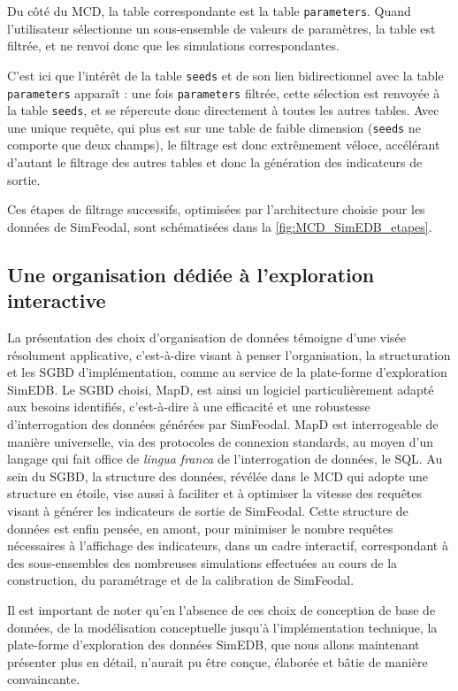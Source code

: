 		Du côté du MCD, la table correspondante est la table \texttt{parameters}. Quand l'utilisateur sélectionne un sous-ensemble de valeurs de paramètres, la table est filtrée, et ne renvoi donc que les simulations correspondantes.

		C'est ici que l'intérêt de la table \texttt{seeds} et de son lien bidirectionnel avec la table \texttt{parameters} apparaît : une fois \texttt{parameters} filtrée, cette sélection est renvoyée à la table \texttt{seeds}, et se répercute donc directement à toutes les autres tables.
		Avec une unique requête, qui plus est sur une table de faible dimension (\texttt{seeds} ne comporte que deux champs), le filtrage est donc extrêmement véloce, accélérant d'autant le filtrage des autres tables et donc la génération des indicateurs de sortie.

		Ces étapes de filtrage successifs, optimisées par l'architecture choisie pour les données de SimFeodal, sont schématisées dans la \cref{fig:MCD_SimEDB_etapes}.


		\subsection*{Une organisation dédiée à l'exploration interactive}
		La présentation des choix d'organisation de données témoigne d'une visée résolument applicative, c'est-à-dire visant à penser l'organisation, la structuration et les SGBD d'implémentation, comme au service de la plate-forme d'exploration SimEDB.
		Le SGBD choisi, MapD, est ainsi un logiciel particulièrement adapté aux besoins identifiés, c'est-à-dire à une efficacité et une robustesse d'interrogation des données générées par SimFeodal.
		MapD est interrogeable de manière universelle, via des protocoles de connexion standards, au moyen d'un langage qui fait office de \textit{lingua franca} de l'interrogation de données, le SQL.
		Au sein du SGBD, la structure des données, révélée dans le MCD qui adopte une structure \og en étoile\fg{}, vise aussi à faciliter et à optimiser la vitesse des requêtes visant à générer les indicateurs de sortie de SimFeodal.
		Cette structure de données est enfin pensée, en amont, pour minimiser le nombre requêtes nécessaires à l'affichage des indicateurs, dans un cadre interactif, correspondant à des sous-ensembles des nombreuses simulations effectuées au cours de la construction, du paramétrage et de la calibration de SimFeodal.

		Il est important de noter qu'en l'absence de ces choix de conception de base de données, de la modélisation conceptuelle jusqu'à l'implémentation technique, la plate-forme d'exploration des données SimEDB, que nous allons maintenant présenter plus en détail, n'aurait pu être conçue, élaborée et bâtie de manière convaincante.